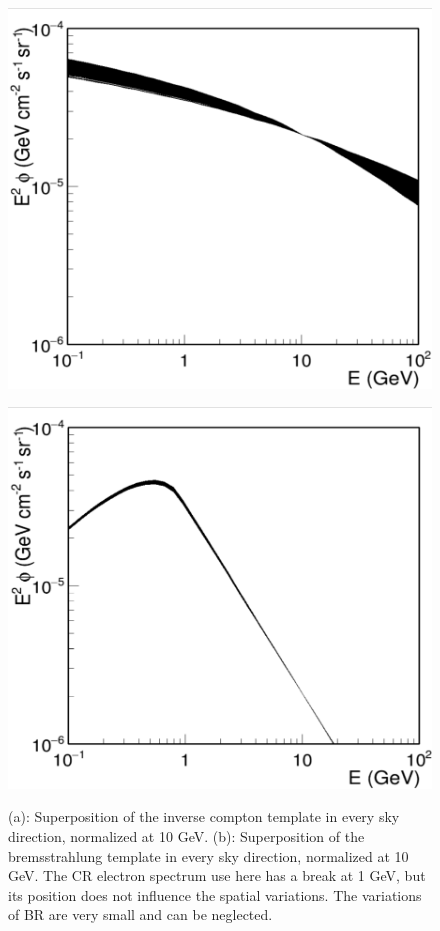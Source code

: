\begin{figure}[h]
  \centering
  \begin{minipage}[h]{0.45\textwidth}
  	\centering
	\includegraphics[trim={0 0cm 0 0.2cm}, clip, width=1.\linewidth]{pic/method/IC_variations.png}
 	\subcaption{}
 	\label{fig:IC_variations}
  \end{minipage}
  \hfill
  \begin{minipage}[h]{0.45\textwidth}
	  \centering
	  \includegraphics[trim={0 0cm 0 0.2cm}, clip, width=1.\linewidth]{pic/method/BR_variations.png}
	  \subcaption{}
	  \label{fig:BR_variations}
  \end{minipage}
  \caption{(a): Superposition of the inverse compton template in every sky direction, normalized at 10 GeV. (b): Superposition of the bremsstrahlung template in every sky direction, normalized at 10 GeV. The CR electron spectrum use here has a break at 1 GeV, but its position does not influence the spatial variations. The variations of BR are very small and can be neglected.}
  \label{fig:IC_BR_variations} 
\end{figure}



